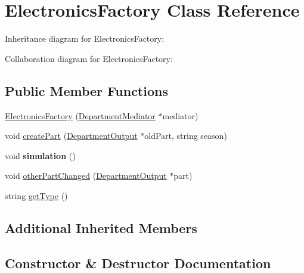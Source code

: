\hypertarget{classElectronicsFactory}{}\section{Electronics\+Factory Class Reference}
\label{classElectronicsFactory}


Inheritance diagram for Electronics\+Factory\+:


Collaboration diagram for Electronics\+Factory\+:
\subsection*{Public Member Functions}
\begin{DoxyCompactItemize}
\item 
\hyperlink{classElectronicsFactory_a4b74b014b01f7956076f97c3efb6c2c5}{Electronics\+Factory} (\hyperlink{classDepartmentMediator}{Department\+Mediator} $\ast$mediator)
\item 
void \hyperlink{classElectronicsFactory_a6489d0e612615f65d76620585a67ff38}{create\+Part} (\hyperlink{classDepartmentOutput}{Department\+Output} $\ast$old\+Part, string season)
\item 
\mbox{\label{classElectronicsFactory_a5e3355480264038e7ec81b83bd73353a}} 
void {\bfseries simulation} ()
\item 
void \hyperlink{classElectronicsFactory_ae21ff30f4890eab2474fac71d2615941}{other\+Part\+Changed} (\hyperlink{classDepartmentOutput}{Department\+Output} $\ast$part)
\item 
string \hyperlink{classElectronicsFactory_a494fea1f1a55bca20ce1bb4c988d9d44}{get\+Type} ()
\end{DoxyCompactItemize}
\subsection*{Additional Inherited Members}


\subsection{Constructor \& Destructor Documentation}
\mbox{\label{classElectronicsFactory_a4b74b014b01f7956076f97c3efb6c2c5}} 

